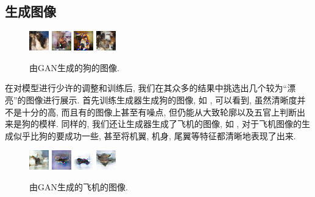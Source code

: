 \documentclass[lang=cn,11pt]{elegantpaper}
\begin{document}
\subsection{生成图像}
\begin{figure}[htbp]
  \centering
  \includegraphics[width=.15\textwidth]{dog1}
  \includegraphics[width=.15\textwidth]{dog2}
  \includegraphics[width=.15\textwidth]{dog3}
  \includegraphics[width=.15\textwidth]{dog4}
  \caption{由GAN生成的狗的图像. \label{fig:dog}}
\end{figure}
在对模型进行少许的调整和训练后, 我们在其众多的结果中挑选出几个较为“漂亮”的图像进行展示. 首先训练生成器生成狗的图像, 如 , 可以看到, 虽然清晰度并不是十分的高, 而且有的图像上甚至有噪点, 但仍能从大致轮廓以及五官上判断出来是狗的模样. 同样的, 我们还让生成器生成了飞机的图像, 如 , 对于飞机图像的生成似乎比狗的要成功一些, 甚至将机翼, 机身, 尾翼等特征都清晰地表现了出来. 
\begin{figure}[htbp]
  \centering
  \includegraphics[width=.15\textwidth]{air1}
  \includegraphics[width=.15\textwidth]{air2}
  \includegraphics[width=.15\textwidth]{air3}
  \includegraphics[width=.15\textwidth]{air4}
  \caption{由GAN生成的飞机的图像. \label{fig:air}}
\end{figure}
\end{document}
